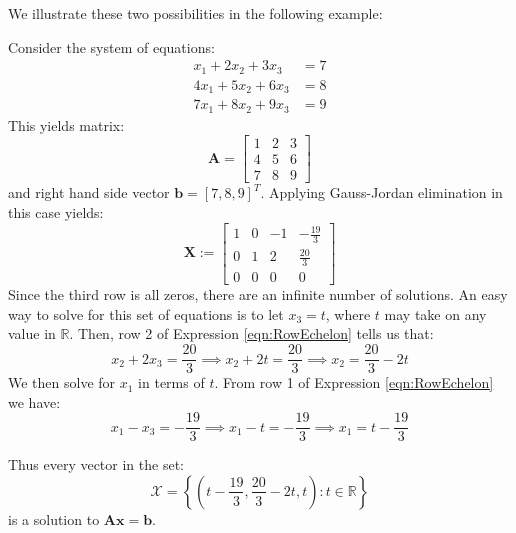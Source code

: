 We illustrate these two possibilities in the following example:
\begin{example}
Consider the system of equations:
\begin{displaymath}
\begin{aligned}
x_1 + 2x_2 + 3x_3 & = 7\\
4x_1 + 5x_2 + 6x_3 & = 8\\
7x_1 + 8x_2 + 9x_3 & =9
\end{aligned}
\end{displaymath}
This yields matrix:
\begin{displaymath}
\mathbf{A} = \begin{bmatrix}
1 & 2 & 3\\
4 & 5 & 6\\
7 & 8 & 9
\end{bmatrix}
\end{displaymath} 
and right hand side vector $\mathbf{b} = [7, 8, 9]^T$. Applying Gauss-Jordan elimination in this case yields:
\begin{equation}
\mathbf{X} :=
\left[
\begin{array}{ccc|c}
1 & 0 & -1 & -\frac{19}{3}\\
0 & 1 & 2 & \frac{20}{3}\\
0 & 0 & 0 & 0
\end{array}
\right]
\label{eqn:RowEchelon}
\end{equation}
Since the third row is all zeros, there are an infinite number of solutions. An easy way to solve for this set of equations is to let $x_3 = t$, where $t$ may take on any value in $\mathbb{R}$. Then, row 2 of Expression \ref{eqn:RowEchelon} tells us that:
\begin{equation}
x_2 + 2x_3 = \frac{20}{3} \implies x_2 + 2t = \frac{20}{3} \implies 
x_2 = \frac{20}{3} - 2t
\end{equation}
We then solve for $x_1$ in terms of $t$. From row 1 of Expression \ref{eqn:RowEchelon} we have:
\begin{equation}
x_1 - x_3 = -\frac{19}{3} \implies x_1 - t = -\frac{19}{3} \implies 
x_1 = t-\frac{19}{3}
\end{equation}

Thus every vector in the set:
\begin{equation}
\mathcal{X} = \left\{\left(t-\frac{19}{3}, \frac{20}{3} - 2t, t\right) : t \in \mathbb{R}\right\}
\end{equation}
is a solution to $\mathbf{A}\mathbf{x} = \mathbf{b}$. 


\end{example}
